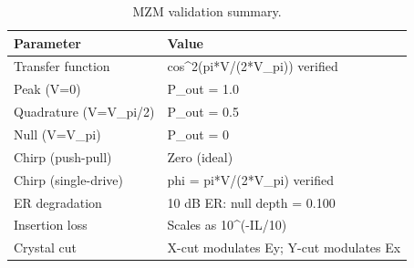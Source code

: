 \begin{table}[!ht]
  \caption{MZM validation summary.}
  \label{tab:mzm}
  \centering
  \begin{tabular}{l l}
    \toprule
    Parameter & Value \\
    \midrule
    Transfer function & cos\textasciicircum{}2(pi*V/(2*V\_pi)) verified \\
    Peak (V=0) & P\_out = 1.0 \\
    Quadrature (V=V\_pi/2) & P\_out = 0.5 \\
    Null (V=V\_pi) & P\_out = 0 \\
    Chirp (push-pull) & Zero (ideal) \\
    Chirp (single-drive) & phi = pi*V/(2*V\_pi) verified \\
    ER degradation & 10 dB ER: null depth = 0.100 \\
    Insertion loss & Scales as 10\textasciicircum{}(-IL/10) \\
    Crystal cut & X-cut modulates Ey; Y-cut modulates Ex \\
    \bottomrule
  \end{tabular}
\end{table}
